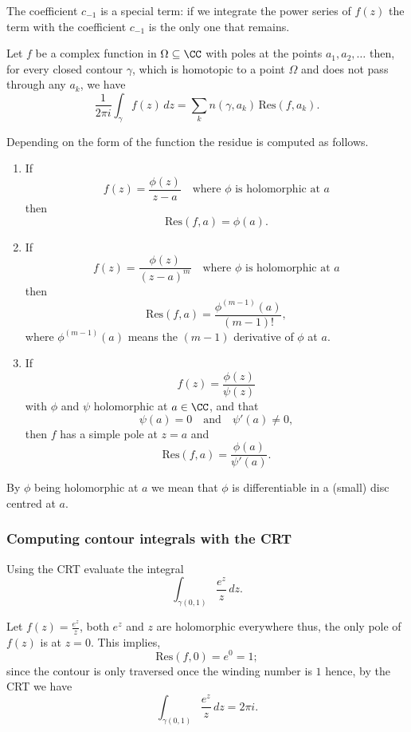 \documentclass[12pt, a4paper]{article}
\begin{document}
\begin{mdremark}
    The coefficient \(c_{-1}\) is a special term: if we integrate the power series of \(f(z)\) the term with the coefficient \(c_{-1}\) is the only one that remains. 
\end{mdremark}

\begin{mdthm}
    Let \(f\) be a complex function in \(\Omega \subseteq \CC\) with poles at the points \(a_1,a_2, \ldots\) then, for every closed contour \(\gamma\), which is homotopic to a point \(\Omega\) and does not pass through any \(a_k\), we have 
    \[\frac{1}{2\pi i} \int_{\gamma} f(z) \, dz = \sum_{k} n(\gamma,a_k) \, \text{Res}(f,a_k).\]
\end{mdthm}

\begin{mdthm}
    Depending on the form of the function the residue is computed as follows.
    \begin{enumerate}
        \item If
        \[f(z) = \frac{\phi(z)}{z-a} \quad \text{where \(\phi\) is holomorphic at \(a\)}\]
        then 
        \[\text{Res}(f,a)=\phi(a).\]
        \item If
        \[f(z) = \frac{\phi(z)}{(z-a)^m} \quad \text{where \(\phi\) is holomorphic at \(a\)}\]
        then 
        \[\text{Res}(f,a)=\frac{\phi^{(m-1)}(a)}{(m-1)!},\]
        where \(\phi^{(m-1)}(a)\) means the \((m-1)\) derivative of \(\phi\) at \(a\).
        \item If 
        \[f(z) = \frac{\phi(z)}{\psi(z)}\]
        with \(\phi\) and \(\psi\) holomorphic at \(a \in \CC\), and that 
        \[\psi(a)=0 \quad \text{and} \quad \psi'(a)\neq 0,\]
        then \(f\) has a simple pole at \(z=a\) and 
        \[\text{Res}(f,a) = \frac{\phi(a)}{\psi'(a)}.\]
    \end{enumerate}
\end{mdthm}

\begin{mdremark}
    By \(\phi\) being holomorphic at \(a\) we mean that \(\phi\) is differentiable in a (small) disc centred at \(a\).
\end{mdremark}

\subsubsection{Computing contour integrals with the CRT}

\begin{example}
    Using the CRT evaluate the integral 
    \[\int_{\gamma(0,1)} \frac{e^z}{z} \, dz.\]
    \begin{solution}
        Let \(f(z) = \frac{e^z}{z}\), both \(e^z\) and \(z\) are holomorphic everywhere thus, the only pole of \(f(z)\) is at \(z=0\). This implies, 
        \[\text{Res}(f,0)=e^0=1;\]
        since the contour is only traversed once the winding number is \(1\) hence, by the CRT we have 
        \[\int_{\gamma(0,1)} \frac{e^z}{z} \, dz = 2\pi i.\]
    \end{solution}
\end{example}
\end{document}
